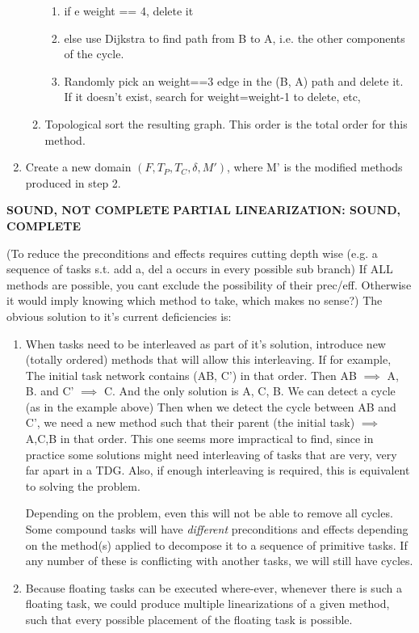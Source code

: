 \begin{enumerate}
\begin{enumerate}
		\begin{enumerate}
			\item if e weight == 4, delete it
			\item else use Dijkstra to find path from B to A, i.e. the other components of the cycle.
			\item Randomly pick an weight==3 edge in the (B, A) path and delete it. If it doesn't exist, search for weight=weight-1 to delete, etc,
		\end{enumerate}
		\item Topological sort the resulting graph. This order is the total order for this method.
	\end{enumerate}
	\item Create a new domain $(F, T_P, T_C, \delta, M')$, where M' is the modified methods produced in step 2.
\end{enumerate}   

 
\textbf{SOUND, NOT COMPLETE}
\textbf{PARTIAL LINEARIZATION: SOUND, COMPLETE}

(To reduce the preconditions and effects requires cutting depth wise (e.g. a sequence of tasks s.t.  add a, del a occurs in every possible sub branch)
If ALL methods are possible, you cant exclude the possibility of their prec/eff. Otherwise it would imply knowing which method to take, which makes no sense?)
The obvious solution to it's current deficiencies is: 
\begin{enumerate}
	\item When tasks need to be interleaved as part of it's solution, introduce new (totally ordered) methods that will allow this interleaving.
	If for example, The initial task network contains (AB, C') in that order. Then AB $\implies$ A, B.  and C' $\implies$ C.
	And the only solution is A, C, B. We can detect a cycle (as in the example above)
	Then when we detect the cycle between AB and C', we need a new method such that their parent (the initial task) $\implies$ A,C,B  in that order.  This one seems more impractical to find,	since in practice some solutions might need interleaving of tasks that are very, very far apart in a TDG.
	Also, if enough interleaving is required, this is equivalent to solving the problem. 
	
	
	Depending on the problem, even this will not be able to remove all cycles.  Some compound tasks will have \emph{different} 
	preconditions and effects depending	on the method(s) applied to decompose it to a sequence of primitive tasks. If any number of
	these is conflicting with another tasks, we will still have cycles.
	
	\item Because floating tasks can be executed where-ever, whenever there is such a floating task, we could produce
	multiple linearizations of a given method, such that every possible placement of the floating task is possible.
\end{enumerate}